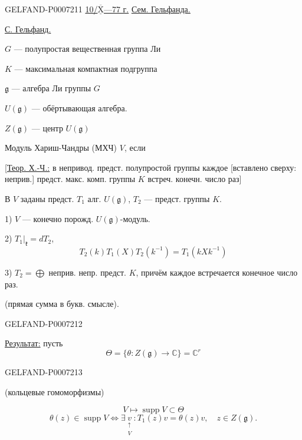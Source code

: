 \begin{GelfandAdjacentEvidence}{GELFAND-P000721}{1}
\underline{10/\(\overline{\underline{\mathrm X}}\)---77 г.}
\qquad\underline{\underline{Сем. Гельфанда.}}

\underline{С. Гельфанд.}

\(G\) --- полупростая вещественная группа Ли

\(K\) --- максимальная компактная подгруппа

\(\mathfrak g\) --- алгебра Ли группы \(G\)

\(U(\mathfrak g)\) --- обёртывающая алгебра.

\(Z(\mathfrak g)\) --- центр \(U(\mathfrak g)\)

Модуль Хариш-Чандры (МХЧ) \(V\), если

[\underline{Теор. Х.-Ч.:} в непривод. предст. полупростой группы каждое
[вставлено сверху: неприв.] предст. макс. комп. группы \(K\) встреч. конечн. число раз]

В \(V\) заданы предст. \(T_1\) алг. \(U(\mathfrak g)\), \(T_2\) --- предст. группы \(K\).

1) \(V\) --- конечно порожд. \(U(\mathfrak g)\)-модуль.

2) \(\left.T_1\right|_{\mathfrak k}=dT_2\),
\[
T_2(k)T_1(X)T_2(k^{-1})=T_1(kXk^{-1})
\]

3) \(T_2=\bigoplus\) неприв. непр. предст. \(K\), причём каждое встречается конечное число раз.

(прямая сумма в букв. смысле).

\end{GelfandAdjacentEvidence}
\begin{GelfandAdjacentEvidence}{GELFAND-P000721}{2}

\underline{Результат:} пусть
\[
\Theta=\{\theta:Z(\mathfrak g)\to\mathbb C\}=\mathbb C^{r}
\]
\end{GelfandAdjacentEvidence}
\begin{GelfandAdjacentEvidence}{GELFAND-P000721}{3}

(кольцевые гомоморфизмы)

\[
V\mapsto\operatorname{supp}V\subset\Theta
\]
\[
\theta(z)\in\operatorname{supp}V
\Longleftrightarrow\exists\underset{\substack{\uparrow\\V}}{v}:
T_1(z)v=\theta(z)v,\quad z\in Z(\mathfrak g).
\]
\end{GelfandAdjacentEvidence}
